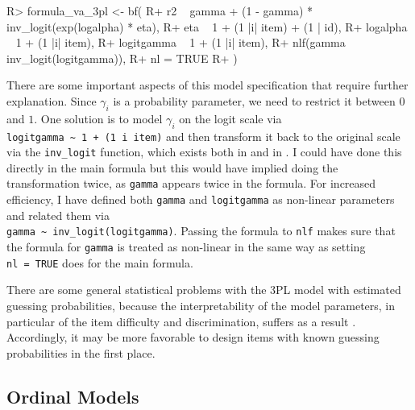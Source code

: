 \documentclass[
]{jss}
\begin{document}
\begin{CodeChunk}

\begin{CodeInput}
R> formula_va_3pl <- bf(
R+   r2 ~ gamma + (1 - gamma) * inv_logit(exp(logalpha) * eta),
R+   eta ~ 1 + (1 |i| item) + (1 | id),
R+   logalpha ~ 1 + (1 |i| item),
R+   logitgamma ~ 1 + (1 |i| item),
R+   nlf(gamma ~ inv_logit(logitgamma)),
R+   nl = TRUE
R+ )
\end{CodeInput}
\end{CodeChunk}

There are some important aspects of this model specification that
require further explanation. Since \(\gamma_i\) is a probability
parameter, we need to restrict it between \(0\) and \(1\). One solution
is to model \(\gamma_i\) on the logit scale via
\texttt{logitgamma\ \textasciitilde{}\ 1\ +\ (1\ \textbar{}i\textbar{}\ item)}
and then transform it back to the original scale via the
\texttt{inv\_logit} function, which exists both in  and in
. I could have done this directly in the main formula but
this would have implied doing the transformation twice, as
\texttt{gamma} appears twice in the formula. For increased efficiency, I
have defined both \texttt{gamma} and \texttt{logitgamma} as non-linear
parameters and related them via\\
\texttt{gamma\ \textasciitilde{}\ inv\_logit(logitgamma)}. Passing the
formula to \texttt{nlf} makes sure that the formula for \texttt{gamma}
is treated as non-linear in the same way as setting \texttt{nl\ =\ TRUE}
does for the main formula.

There are some general statistical problems with the 3PL model with
estimated guessing probabilities, because the interpretability of the
model parameters, in particular of the item difficulty and
discrimination, suffers as a result \citep{han2012}. Accordingly, it may
be more favorable to design items with known guessing probabilities in
the first place.

\hypertarget{ordinal}{%
\subsection{Ordinal Models}\label{ordinal}}
\end{document}
